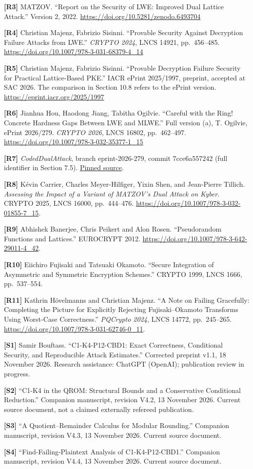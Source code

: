 \documentclass[
  11pt,
  a4paper,
  oneside]{report}
\begin{document}
\textbf{{[}R3{]}} MATZOV. ``Report on the Security of LWE: Improved Dual
Lattice Attack.'' Version 2, 2022.
\url{https://doi.org/10.5281/zenodo.6493704}

\textbf{{[}R4{]}} Christian Majenz, Fabrizio Sisinni. ``Provable
Security Against Decryption Failure Attacks from LWE.'' \emph{CRYPTO
2024}, LNCS 14921, pp.~456--485.
\url{https://doi.org/10.1007/978-3-031-68379-4_14}

\textbf{{[}R5{]}} Christian Majenz, Fabrizio Sisinni. ``Provable
Decryption Failure Security for Practical Lattice-Based PKE.'' IACR
ePrint 2025/1997, preprint, accepted at SAC 2026. The comparison in
Section 10.8 refers to the ePrint version.
\url{https://eprint.iacr.org/2025/1997}

\textbf{{[}R6{]}} Jianhua Hou, Haodong Jiang, Tabitha Ogilvie. ``Careful
with the Ring! Concrete Hardness Gaps Between LWE and MLWE.'' Full
version (a), T. Ogilvie, ePrint 2026/279. \emph{CRYPTO 2026}, LNCS
16802, pp.~462--497. \url{https://doi.org/10.1007/978-3-032-35377-1_15}

\textbf{{[}R7{]}} \emph{CodedDualAttack}, branch eprint-2026-279, commit
7cce6a557242 (full identifier in Section 7.5).
\href{https://github.com/identitymapping/CodedDualAttack/tree/7cce6a5572420004da31be58f26954cedfc885d0}{Pinned
source}.

\textbf{{[}R8{]}} Kévin Carrier, Charles Meyer-Hilfiger, Yixin Shen, and
Jean-Pierre Tillich. \emph{Assessing the Impact of a Variant of MATZOV's
Dual Attack on Kyber}. CRYPTO 2025, LNCS 16000, pp.~444--476.
\url{https://doi.org/10.1007/978-3-032-01855-7_15}.

\textbf{{[}R9{]}} Abhishek Banerjee, Chris Peikert and Alon Rosen.
``Pseudorandom Functions and Lattices.'' EUROCRYPT 2012.
\url{https://doi.org/10.1007/978-3-642-29011-4_42}.

\textbf{{[}R10{]}} Eiichiro Fujisaki and Tatsuaki Okamoto. ``Secure
Integration of Asymmetric and Symmetric Encryption Schemes.'' CRYPTO
1999, LNCS 1666, pp.~537--554.

\textbf{{[}R11{]}} Kathrin Hövelmanns and Christian Majenz. ``A Note on
Failing Gracefully: Completing the Picture for Explicitly Rejecting
Fujisaki--Okamoto Transforms Using Worst-Case Correctness.''
\emph{PQCrypto 2024}, LNCS 14772, pp.~245--265.
\url{https://doi.org/10.1007/978-3-031-62746-0_11}.

\textbf{{[}S1{]}} Samir Bouftass. ``C1-K4-P12-CBD1: Exact Correctness,
Conditional Security, and Reproducible Attack Estimates.'' Corrected
preprint v1.1, 18 November 2026. Research assistance: ChatGPT (OpenAI);
publication review in progress.

\textbf{{[}S2{]}} ``C1-K4 in the QROM: Structural Bounds and a
Conservative Conditional Reduction.'' Companion manuscript, revision
V4.2, 13 November 2026. Current source document, not a claimed
externally refereed publication.

\textbf{{[}S3{]}} ``A Quotient--Remainder Calculus for Modular
Rounding.'' Companion manuscript, revision V4.3, 13 November 2026.
Current source document.

\textbf{{[}S4{]}} ``Find-Failing-Plaintext Analysis of C1-K4-P12-CBD1.''
Companion manuscript, revision V4.4, 13 November 2026. Current source
document.
\end{document}
